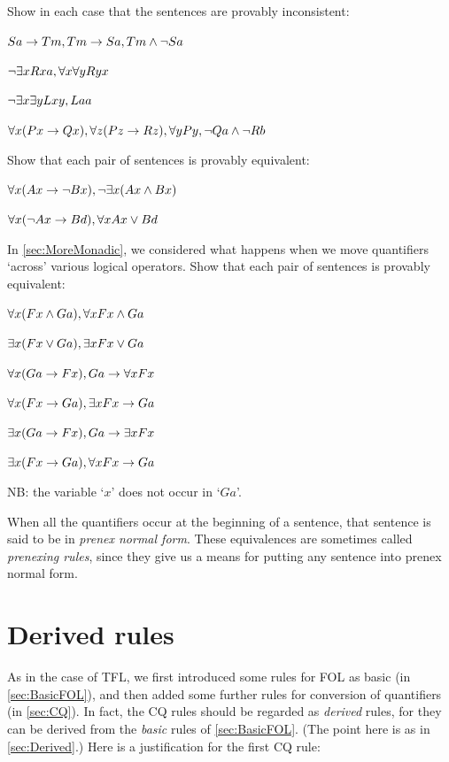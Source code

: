 \begin{practiceproblems}
\problempart
Show in each case that the sentences are provably inconsistent:
\begin{problemslist}
\item $Sa\rightarrow Tm, Tm \rightarrow Sa, Tm \mathbin{\wedge} \neg Sa$
\item $\neg\exists x Rxa, \forall x \forall y Ryx$
\item $\neg\exists x \exists y Lxy, Laa$
\item $\forall x(Px \rightarrow Qx), \forall z(Pz \rightarrow Rz), \forall y Py, \neg Qa \mathbin{\wedge} \neg Rb$
\end{problemslist}

\problempart
Show that each pair of sentences is provably equivalent:
\begin{problemslist}
\item $\forall x (Ax\rightarrow \neg Bx), \neg\exists x(Ax \mathbin{\wedge} Bx)$
\item $\forall x (\neg Ax\rightarrow Bd), \forall x Ax \vee Bd$
\end{problemslist}

\problempart
In \cref{sec:MoreMonadic}, we considered what happens when we move quantifiers `across' various logical operators. Show that each pair of sentences is provably equivalent:
\begin{problemslist}
\item $\forall x (Fx \mathbin{\wedge} Ga), \forall x Fx \mathbin{\wedge} Ga$
\item $\exists x (Fx \vee Ga), \exists x Fx \vee Ga$
\item $\forall x(Ga \rightarrow Fx), Ga \rightarrow \forall x Fx$
\item $\forall x(Fx \rightarrow Ga), \exists x Fx \rightarrow Ga$
\item $\exists x(Ga \rightarrow Fx), Ga \rightarrow \exists x Fx$
\item $\exists x(Fx \rightarrow Ga), \forall x Fx \rightarrow Ga$
\end{problemslist}
NB: the variable `$x$' does not occur in `$Ga$'.

When all the quantifiers occur at the beginning of a sentence, that sentence is said to be in \emph{prenex normal form}. These equivalences are sometimes called \emph{prenexing rules}, since they give us a means for putting any sentence into prenex normal form.



\end{practiceproblems}


\chapter{Derived rules}\label{sec:DerivedFOL}
As in the case of TFL, we first introduced some rules for FOL as basic (in \cref{sec:BasicFOL}), and then added some further rules for conversion of quantifiers (in \cref{sec:CQ}). In fact, the CQ rules should be regarded as \emph{derived} rules, for they can be derived from the  \emph{basic} rules of \cref{sec:BasicFOL}. (The point here is as in \cref{sec:Derived}.) Here is a justification for the first CQ rule:

